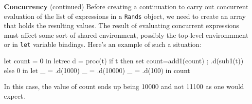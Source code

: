 \begin{minipage}[t]{\sw}
\slidenumber
\LARGE
{\bf Concurrency} (continued)\exx
Before creating a continuation
to carry out concurrent evaluation
of the list of expressions in a \verb'Rands' object,
we need to create an array that holds
the resulting values.
The result of evaluating concurrent expressions
must affect some sort of shared environment,
possibly the top-level environmment or in \verb'let' variable bindings.
Here's an example of such a situation:
\Large
\begin{qv}
let
  count = 0
in
  letrec
    d = proc(t)
      if t
      then {set count=add1(count) ; .d(sub1(t))}
      else 0
  in
    let %
      _ = .d(1000)
      _ = .d(10000)
      _ = .d(100)
    in
      count
\end{qv}
\LARGE
In this case, the value of count ends up being 10000
and not 11100 as one would expect.
\end{minipage}
